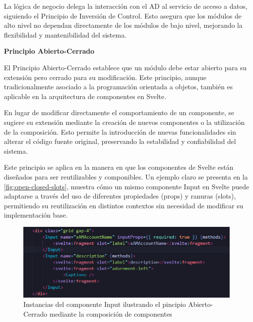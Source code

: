 La lógica de negocio delega la interacción con el AD al servicio de acceso a datos, siguiendo el Principio de Inversión de Control. Esto asegura que los módulos de alto nivel no dependan directamente de los módulos de bajo nivel, mejorando la flexibilidad y mantenibilidad del sistema.

\textbf{Principio Abierto-Cerrado}

El Principio Abierto-Cerrado establece que un módulo debe estar abierto para su extensión pero cerrado para su modificación. Este principio, aunque tradicionalmente asociado a la programación orientada a objetos, también es aplicable en la arquitectura de componentes en Svelte.

En lugar de modificar directamente el comportamiento de un componente, se sugiere su extensión mediante la creación de nuevos componentes o la utilización de la composición. Esto permite la introducción de nuevas funcionalidades sin alterar el código fuente original, preservando la estabilidad y confiabilidad del sistema.

Este principio se aplica en la manera en que los componentes de Svelte están diseñados para ser reutilizables y componibles. Un ejemplo claro se presenta en la \autoref{fig:open-closed-slots}, muestra cómo un mismo componente Input en Svelte puede adaptarse a través del uso de diferentes propiedades (props) y ranuras (slots), permitiendo su reutilización en distintos contextos sin necesidad de modificar su implementación base.

\begin{figure}[H]
    \centering
    \includegraphics[width=\linewidth]{images/code/open-closed-slots.png}
    \caption{Instancias del componente Input ilustrando el pincipio Abierto-Cerrado mediante la composición de componentes}
    \label{fig:open-closed-slots}
\end{figure}